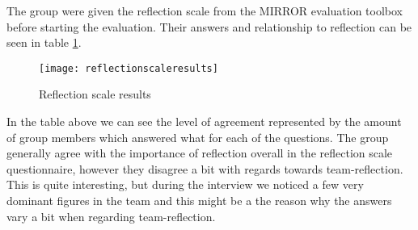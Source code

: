 The group were given the reflection scale from the MIRROR evaluation toolbox before starting the evaluation. Their answers and relationship to reflection can be seen in table \ref{reflectionscaleresults}. 
\begin{figure}[H]
\centering
	\texttt{[image: reflectionscaleresults]}
\caption{Reflection scale results}
\label{reflectionscaleresults}
\end{figure}
% 
%
In the table above we can see the level of agreement represented by the amount of group members which answered what for each of the questions. The group generally agree with the importance of reflection overall in the reflection scale questionnaire, however they disagree a bit with regards towards team-reflection. This is quite interesting, but during the interview we noticed a few very dominant figures in the team and this might be a the reason why the answers vary a bit when regarding team-reflection.

